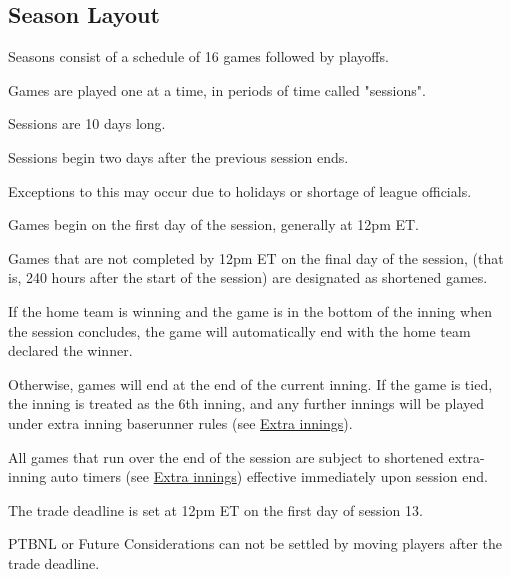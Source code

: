 
\subsection{Season Layout}
\begin{deepEnumerate}
	\item Seasons consist of a schedule of 16 games followed by playoffs.
	\item Games are played one at a time, in periods of time called "sessions".
	\begin{deepEnumerate}
		\item Sessions are 10 days long.
		\item Sessions begin two days after the previous session ends.
		\begin{deepEnumerate}
			\item Exceptions to this may occur due to holidays or shortage of league officials.
		\end{deepEnumerate}
		\item Games begin on the first day of the session, generally at 12pm ET.
		\item Games that are not completed by 12pm ET on the final day of the session,
		(that is, 240 hours after the start of the session)
		are designated as shortened games.
		\begin{deepEnumerate}
			\item If the home team is winning 
			and the game is in the bottom of the inning
			when the session concludes,
			the game will automatically end with the home team declared the winner.
			\item Otherwise, games will end at the end of the current inning.
			If the game is tied, the inning is treated as the 6th inning,
			and any further innings will be played under extra inning baserunner rules
			(see \hyperref[sec:extra innings]{Extra innings}).
			\item All games that run over the end of the session 
			are subject to shortened extra-inning auto timers
			(see \hyperref[sec:extra innings]{Extra innings}) 
			effective immediately upon session end.
		\end{deepEnumerate}
		\item The trade deadline is set at 12pm ET on the first day of session 13.
		\begin{deepEnumerate}
			\item PTBNL or Future Considerations can not be settled by moving players after the trade deadline.

\end{deepEnumerate}
\end{deepEnumerate}
\end{deepEnumerate}
